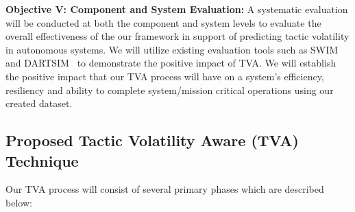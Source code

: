 \documentclass[12pt]{article}
\newcommand{\dan}[1]{\textcolor{blue}{{\it [Dan: #1]}}}
\begin{document}

\vspace{2mm} \noindent \textbf{Objective V: Component and System Evaluation: }A systematic evaluation will be conducted at both the component and system levels to evaluate the overall effectiveness of the our framework in support of predicting tactic volatility in autonomous systems. We will utilize existing evaluation tools such as SWIM~\cite{moreno2018swim} and DARTSIM~\cite{MorenoDART2019} to demonstrate the positive impact of TVA. We will establish the positive impact that our TVA process will have on a system's efficiency, resiliency and ability to complete system/mission critical operations using our created dataset.


\subsection{Proposed Tactic Volatility Aware (TVA) Technique}



Our TVA process will consist of several primary phases which are described below:
\end{document}
